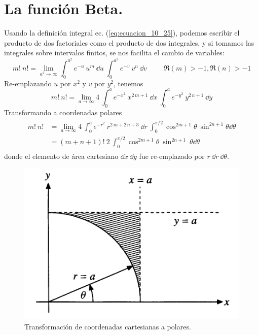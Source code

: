 \section{La función Beta.}
Usando la definición integral ec. (\ref{eq:ecuacion_10_25}), podemos escribir el producto de dos factoriales como el producto de dos integrales, y si tomamos las integrales sobre intervalos finitos, se nos facilita el cambio de variables:
\begin{equation}
m! \: n! = \lim_{a^{2} \to \infty} \int_{0}^{a^{2}} e^{-u} \: u^{m} \: \dd u \: \int_{0}^{a^{2}} e^{-v} \: v^{n} \: \dd v \hspace{1cm} \Re (m) > -1, \Re (n) > -1
\label{eq:ecuacion_10_56a}
\end{equation}
Re-emplazando $u$ por $x^{2}$ y $v$ por $y^{2}$, tenemos
\begin{equation}
m! \: n! =  \lim_{a \to \infty} 4 \: \int_{0}^{a} e^{-x^{2}} \: x ^{2 \, m+1} \: \dd x \: \int_{0}^{a} e^{-y^{2}} \: y^{2 \, n+1} \: \dd y
\label{eq:ecuacion_10_56b}
\end{equation}
Transformando a coordenadas polares
\begin{align}
\begin{aligned}
m! \: n! &= \lim_{a \to \infty} 4 \: \int_{0}^{a} e^{-r^{2}} \: r^{2 \, m + 2 \, n+3} \: \dd r \: \int_{0}^{\pi/2} \cos^{2m+1} \theta \: \sin^{2n+1} \theta \dd \theta \\
&= (m+n+1)! \: 2 \: \int_{0}^{\pi/2} \cos^{2m+1} \theta \: \sin^{2n+1} \: \theta \dd \theta
\label{eq:ecuacion_10_58}
\end{aligned}
\end{align}
donde el elemento de área cartesiano $\dd x \: \dd y$ fue re-emplazado por $r \: \dd r \: \dd \theta$.
\begin{figure}[H]
    \centering
    \includegraphics[scale=0.5]{Imagenes/FuncionBeta_01.png}
    \caption{Transformación de coordenadas cartesianas a polares.}
    \label{fig:figura_10_06}
\end{figure}
